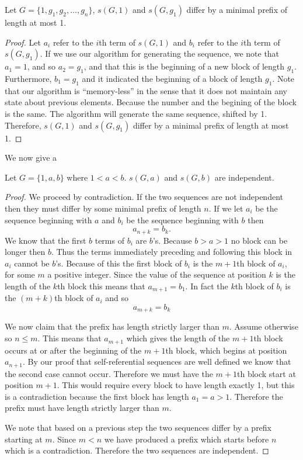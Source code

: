 \documentclass[runningheads,a4paper]{llncs}
\begin{document}
\begin{lemma} Let $G = \{1, g_1, g_2, \ldots, g_n\}$, $s(G, 1)$ and $s(G, g_1)$ differ by a minimal prefix of length at most 1.
\end{lemma}
\begin{proof}
Let $a_i$ refer to the $i$th term of $s(G, 1)$ and $b_i$ refer to the $i$th term of $s(G, g_1)$. If we use our algorithm for generating the sequence, we note that $a_1 = 1$, and so $a_2 = g_1$, and that this is the beginning of a new block of length $g_1$. Furthermore, $b_1 = g_1$ and it indicated the beginning of a block of length $g_1$. Note that our algorithm is ``memory-less'' in the sense that it does not maintain any state about previous elements. Because the number and the begining of the block is the same. The algorithm will generate the same sequence, shifted by 1. Therefore, $s(G,1)$ and $s(G, g_1)$ differ by a minimal prefix of length at most 1.
\end{proof}
We now give a 
\begin{theorem}
\label{independentsequences}
Let $G = \{ 1, a, b\}$ where $1<a<b$. $s(G, a)$ and $s(G, b)$ are independent.
\end{theorem}
\begin{proof}
We proceed by contradiction. If the two sequences are not independent then they must differ by some minimal prefix of length $n$. If we let $a_i$ be the sequence beginning with $a$ and $b_i$ be the sequence beginning with $b$ then
\begin{equation*}
a_{n+k} = b_{k}.
\end{equation*}
We know that the first $b$ terms of $b_i$ are $b$'s. Because $b>a>1$ no block can be longer then $b$. Thus the terms immediately preceding and following this block in  $a_i$ cannot be $b$'s. Because of this the first block of $b_i$ is the $m+1$th block of $a_i$, for some $m$ a positive integer. Since the value of the sequence at position $k$ is the length of the $k$th block this means that $a_{m+1}=b_1$. In fact the $k$th block of $b_i$ is the $(m+k)$th block of $a_i$ and so 
\begin{equation*}
a_{m+k} = b_k
\end{equation*}

We now claim that the prefix has length strictly larger than $m$. Assume otherwise so $n \leq m$. 
This means that $a_{m+1}$ which gives the length of the $m+1$th block occurs at or after the beginning of the $m+1$th block, which begins at position $a_{n+1}$. By our proof that self-referential sequences are well defined we know that the second case cannot occur. Therefore we must have the $m+1$th block start at position $m+1$. This would require every block to have length exactly 1, but this is a contradiction because the first block has length $a_1=a>1$. Therefore the prefix must have length strictly larger than $m$. 

We note that based on a previous step the two sequences differ by a prefix starting at $m$. Since $m<n$ we have produced a prefix which starts before $n$ which is a contradiction. Therefore the two sequences are independent. 
\end{proof}
\end{document}
